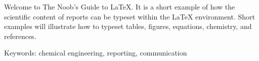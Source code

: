 Welcome to The Noob's Guide to \LaTeX. It is a short example of how the scientific content of reports can be typeset within the \LaTeX{} environment. Short examples will illustrate how to typeset tables, figures, equations, chemistry, and references.

Keywords: chemical engineering, reporting, communication
